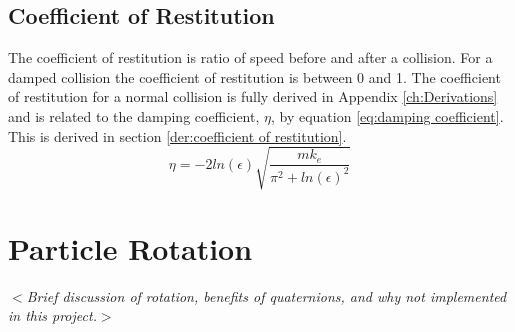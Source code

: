 \documentclass[10pt,a4paper,titlepage]{report}
\begin{document}
\subsection{Coefficient of Restitution}
The coefficient of restitution is ratio of speed before and after a collision. For a damped collision the coefficient of restitution is between 0 and 1. The coefficient of restitution for a normal collision is fully derived in Appendix \ref{ch:Derivations} and is related to the damping coefficient, $\eta$, by equation \ref{eq:damping coefficient}. This is derived in section \ref{der:coefficient of restitution}.
\begin{equation}
\eta = - 2 ln(\epsilon) \sqrt{\dfrac{m k_e}{\pi^2 + ln(\epsilon)^2}}
\label{eq:damping coefficient}
\end{equation}
\section{Particle Rotation}
$<$\textit{Brief discussion of rotation, benefits of quaternions, and why not implemented in this project.}$>$
\end{document}
